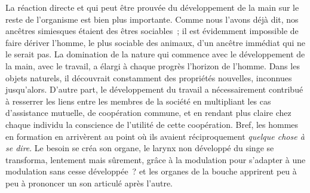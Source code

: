\documentclass[french,twoside]{book} %
\begin{document}
La réaction directe et qui peut être prouvée du développement de la main sur le reste de l’organisme est bien plus importante. Comme nous l’avons déjà dit, nos ancêtres simiesques étaient des êtres sociables ; il est évidemment impossible de faire dériver l’homme, le plus sociable des animaux, d’un ancêtre immédiat qui ne le serait pas. La domination de la nature qui commence avec le développement de la main, avec le travail, a élargi à chaque progrès l’horizon de l’homme. Dans les objets naturels, il découvrait constamment des propriétés nouvelles, inconnues jusqu’alors. D’autre part, le développement du travail a nécessairement contribué à resserrer les liens entre les membres de la société en multipliant les cas d’assistance mutuelle, de coopération commune, et en rendant plus claire chez chaque individu la conscience de l’utilité de cette coopération. Bref, les hommes en formation en arrivèrent au point où ils avaient réciproquement \emph{quelque chose à se dire}. Le besoin se créa son organe, le larynx non développé du singe se transforma, lentement mais sûrement, grâce à la modulation pour s’adapter à une modulation sans cesse développée ? et les organes de la bouche apprirent peu à peu à prononcer un son articulé après l’autre.\par
\end{document}
